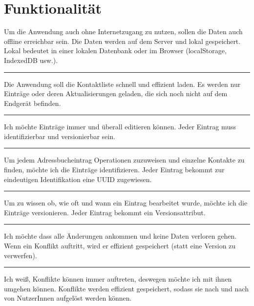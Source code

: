 \section{Funktionalität}
  {Um die Anwendung auch ohne Internetzugang zu nutzen, sollen die Daten auch offline erreichbar sein.}
  {Die Daten werden auf dem Server und lokal gespeichert. Lokal bedeutet in einer lokalen Datenbank oder im Browser (localStorage, IndexedDB usw.).}\\
  \rule{\textwidth}{0.4pt}
  {Die Anwendung soll die Kontaktliste schnell und effizient laden.}
  {Es werden nur Einträge oder deren Aktualisierungen geladen, die sich noch nicht auf dem Endgerät befinden.}\\
  \rule{\textwidth}{0.4pt}
  {Ich möchte Einträge immer und überall editieren können.}
  {Jeder Eintrag muss identifizierbar und versionierbar sein.}\\
  \rule{\textwidth}{0.4pt}
  {Um jedem Adressbucheintrag Operationen zuzuweisen und einzelne Kontakte zu finden, möchte ich die Einträge identifizieren.}
  {Jeder Eintrag bekommt zur eindeutigen Identifikation eine \gls{UUID} zugewiesen.}\\
  \rule{\textwidth}{0.4pt}
  {Um zu wissen ob, wie oft und wann ein Eintrag bearbeitet wurde, möchte ich die Einträge versionieren.}
  {Jeder Eintrag bekommt ein Versionsattribut.}\\
  \rule{\textwidth}{0.4pt}
  {Ich möchte dass alle Änderungen ankommen und keine Daten verloren gehen.}
  {Wenn ein Konflikt auftritt, wird er effizient gespeichert (statt eine Version zu verwerfen).}\\
  \rule{\textwidth}{0.4pt}
  {Ich weiß, Konflikte können immer auftreten, deswegen möchte ich mit ihnen umgehen können.}
  {Konflikte werden effizient gespeichert, sodass sie nach und nach von NutzerInnen aufgelöst werden können.}\\
\\\\
